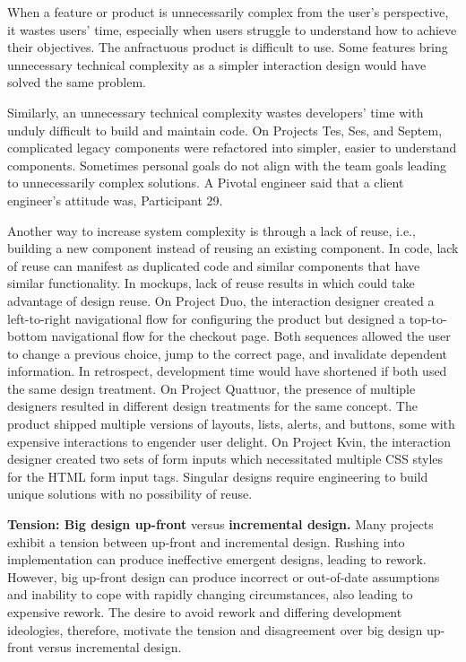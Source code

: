 When a feature or product is unnecessarily complex from the user's perspective, it wastes users' time, especially when users struggle to understand how to achieve their objectives. The anfractuous product is difficult to use. Some features bring unnecessary technical complexity as a simpler interaction design would have solved the same problem. %

Similarly, an unnecessary technical complexity wastes developers' time with unduly difficult to build and maintain code. On Projects Tes, Ses, and Septem, complicated legacy components were refactored into simpler, easier to understand components. Sometimes personal goals do not align with the team goals leading to unnecessarily complex solutions. A Pivotal engineer said that a client engineer's attitude was,  \textemdash Participant 29.

Another way to increase system complexity is through a lack of reuse, i.e., building a new component instead of reusing an existing component. In code, lack of reuse can manifest as duplicated code and similar components that have similar functionality. In mockups, lack of reuse results in  which could take advantage of design reuse. On Project Duo, the interaction designer created a left-to-right navigational flow for configuring the product but designed a top-to-bottom navigational flow for the checkout page. Both sequences allowed the user to change a previous choice, jump to the correct page, and invalidate dependent information. In retrospect, development time would have shortened if both used the same design treatment. On Project Quattuor, the presence of multiple designers resulted in different design treatments for the same concept. The product shipped multiple versions of layouts, lists, alerts, and buttons, some with expensive interactions to engender user delight. On Project Kvin, the interaction designer created two sets of form inputs which necessitated multiple CSS styles for the HTML form input tags. Singular designs require engineering to build unique solutions with no possibility of reuse.   

\textbf{Tension: Big design up-front} versus \textbf{incremental design.}
Many projects exhibit a tension between up-front and incremental design. Rushing into implementation can produce ineffective emergent designs, leading to rework. However, big up-front design can produce incorrect or out-of-date assumptions and inability to cope with rapidly changing circumstances, also leading to expensive rework. The desire to avoid rework and differing development ideologies, therefore, motivate the tension and disagreement over big design up-front versus incremental design. 

